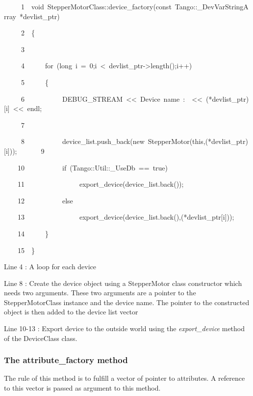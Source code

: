 
\begin{lyxcode}
~~~~~1~~void~StepperMotorClass::device\_factory(const~Tango::\_DevVarStringArray~{*}devlist\_ptr)

~~~~~2~~\{

~~~~~3~~~~~~~~~~

~~~~~4~~~~~~for~(long~i~=~0;i~<~devlist\_ptr->length();i++)

~~~~~5~~~~~~\{

~~~~~6~~~~~~~~~~~DEBUG\_STREAM~<\textcompwordmark{}<~\textquotedbl{}Device~name~:~\textquotedbl{}~<\textcompwordmark{}<~({*}devlist\_ptr){[}i{]}~<\textcompwordmark{}<~endl;

~~~~~7~~~~~~~~~~~~~~~~~~~~~~~~~~~~~~~~~~~~~~~~~~~~~~~~~~

~~~~~8~~~~~~~~~~~device\_list.push\_back(new~StepperMotor(this,({*}devlist\_ptr){[}i{]}));~~~~~~~9~~

~~~~10~~~~~~~~~~~if~(Tango::Util::\_UseDb~==~true)

~~~~11~~~~~~~~~~~~~~~~export\_device(device\_list.back());

~~~~12~~~~~~~~~~~else

~~~~13~~~~~~~~~~~~~~~~export\_device(device\_list.back(),({*}devlist\_ptr{[}i{]}));

~~~~14~~~~~~\}

~~~~15~~\}
\end{lyxcode}


Line 4 : A loop for each device

Line 8 : Create the device object using a StepperMotor class constructor
which needs two arguments. These two arguments are a pointer to the
StepperMotorClass instance and the device name. The pointer to the
constructed object is then added to the device list vector

Line 10-13 : Export device to the outside world using the \emph{export\_device}
method of the DeviceClass class.

\subsubsection{The attribute\_factory method}

The rule of this method is to fulfill a vector of pointer to attributes.
A reference to this vector is passed as argument to this method.

